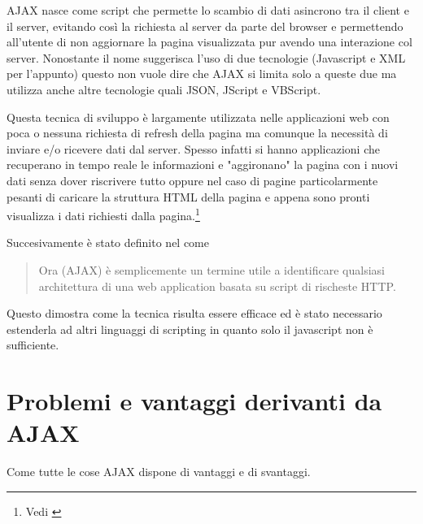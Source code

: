 \documentclass[a4paper,12pt]{report}
\begin{document}
AJAX nasce come script che permette lo scambio di dati asincrono tra il client e il server, evitando così la richiesta al server da parte del browser e permettendo all'utente di non aggiornare la pagina visualizzata pur avendo una interazione col server. Nonostante il nome suggerisca l'uso di due tecnologie (Javascript e XML per l'appunto) questo non vuole dire che AJAX si limita solo a queste due ma utilizza anche altre tecnologie quali JSON, JScript e VBScript.

Questa tecnica di sviluppo è largamente utilizzata nelle applicazioni web con poca o nessuna richiesta di refresh della pagina ma comunque la necessità di inviare e/o ricevere dati dal server. Spesso infatti si hanno applicazioni che recuperano in tempo reale le informazioni e "aggironano" la pagina con i nuovi dati senza dover riscrivere tutto oppure nel caso di pagine particolarmente pesanti di caricare la struttura HTML della pagina e appena sono pronti visualizza i dati richiesti dalla pagina.\footnote{Vedi \cites{flanaganjavascript} }

Succesivamente è stato definito nel \textcites[pag~491]{flanaganjavascript} come 
\begin{quotation}
Ora (AJAX) è semplicemente un termine utile a identificare qualsiasi architettura di una web application basata su script di rischeste HTTP.
\end{quotation}

Questo dimostra come la tecnica risulta essere efficace ed è stato necessario estenderla ad altri linguaggi di scripting in quanto solo il javascript non è sufficiente.

\section{Problemi e vantaggi derivanti da AJAX}
Come tutte le cose AJAX dispone di vantaggi e di svantaggi.
\end{document}
